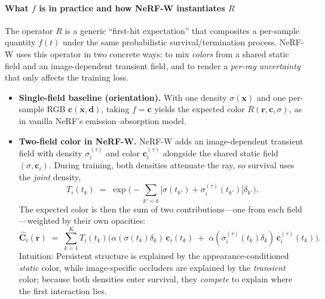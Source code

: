 \begin{enrichment}
\begin{enrichment}
        \paragraph{What \(f\) is in practice and how NeRF-W instantiates \(R\)}
        The operator \(R\) is a generic “first-hit expectation” that composites a per-sample quantity \(f(t)\) under the same probabilistic survival/termination process. NeRF-W uses this operator in two concrete ways: to mix \emph{colors} from a shared static field and an image-dependent transient field, and to render a \emph{per-ray uncertainty} that only affects the training loss.
        \begin{itemize}[leftmargin=*,itemsep=0.25em]
            \item \textbf{Single-field baseline (orientation).} With one density \(\sigma(\mathbf{x})\) and one per-sample RGB \(\mathbf{c}(\mathbf{x},\mathbf{d})\), taking \(f=\mathbf{c}\) yields the expected color \(R(\mathbf{r},\mathbf{c},\sigma)\), as in vanilla NeRF’s emission–absorption model.
            \item \textbf{Two-field color in NeRF-W.} NeRF-W adds an image-dependent transient field with density \(\sigma^{(\tau)}_i\) and color \(\mathbf{c}^{(\tau)}_i\) alongside the shared static field \((\sigma,\mathbf{c}_i)\). During training, both densities attenuate the ray, so survival uses the \emph{joint} density,
            \[
            T_i(t_k)\;=\;\exp\!\Big(-\sum_{k'<k}\big[\sigma(t_{k'})+\sigma^{(\tau)}_i(t_{k'})\big]\delta_{k'}\Big).
            \]
            The expected color is then the sum of two contributions—one from each field—weighted by their own opacities:
            \begin{equation}
                \label{eq:nerfw_composite_color_recap}
                \hat{\mathbf{C}}_i(\mathbf{r})
                \;=\;
                \sum_{k=1}^{K} T_i(t_k)\Big(
                \alpha(\sigma(t_k)\delta_k)\,\mathbf{c}_i(t_k)
                \;+\;
                \alpha(\sigma^{(\tau)}_i(t_k)\delta_k)\,\mathbf{c}^{(\tau)}_i(t_k)
                \Big).
            \end{equation}
            Intuition: Persistent structure is explained by the appearance-conditioned \emph{static} color, while image-specific occluders are explained by the \emph{transient} color; because both densities enter survival, they \emph{compete} to explain where the first interaction lies.
            

\end{itemize}
\end{enrichment}
\end{enrichment}
